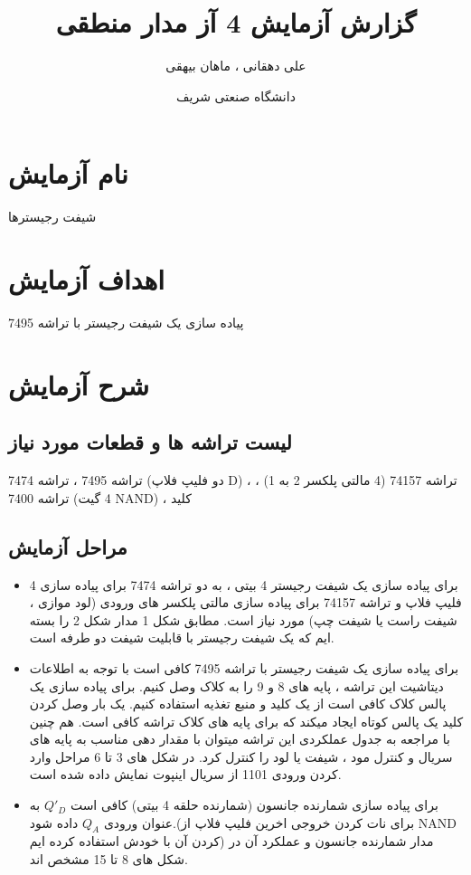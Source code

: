 \documentclass[twoside]{article}
\title{\Huge گزارش آزمایش 4 آز مدار منطقی }
\author{\Large علی دهقانی ، ماهان بیهقی}
\date{دانشگاه صنعتی شریف}
\begin{document}
	\maketitle
	\newpage
	\section*{نام آزمایش}
	شیفت رجیسترها
	
	\section*{اهداف آزمایش}
	پیاده سازی یک شیفت رجیستر با تراشه 7495
	
	\section*{شرح آزمایش}
	
	\subsection*{لیست تراشه ها و قطعات مورد نیاز}
	تراشه 7495 ، تراشه 7474 (دو فلیپ فلاپ D) ، تراشه 74157 (4 مالتی پلکسر 2 به 1) ، تراشه 7400 (4 گیت NAND) ، کلید 
	
	\subsection*{مراحل آزمایش}
	
	\begin{itemize}
	\item
	برای پیاده سازی یک شیفت رجیستر 4 بیتی ، به دو تراشه 7474 برای پیاده سازی 4 فلیپ فلاپ و تراشه 74157 برای پیاده سازی مالتی پلکسر های ورودی (لود موازی ، شیفت راست یا شیفت چپ) مورد نیاز است. مطابق شکل 1 مدار شکل 2 را بسته ایم که یک شیفت رجیستر با قابلیت شیفت دو طرفه است.
	
	\item
	برای پیاده سازی یک شیفت رجیستر با تراشه 7495 کافی است با توجه به اطلاعات دیتاشیت این تراشه ، پایه های 8 و 9 را به کلاک وصل کنیم. برای پیاده سازی یک پالس کلاک کافی است از یک کلید و منبع تغذیه استفاده کنیم. یک بار وصل کردن کلید یک پالس کوتاه ایجاد میکند که برای پایه های کلاک تراشه کافی است. هم چنین با مراجعه به جدول عملکردی این تراشه میتوان با مقدار دهی مناسب به پایه های سریال و کنترل مود ، شیفت یا لود را کنترل کرد. در شکل های 3 تا 6 مراحل وارد کردن ورودی 1101 از سریال اینپوت نمایش داده شده است.
	
	\item
	برای پیاده سازی شمارنده جانسون (شمارنده حلقه 4 بیتی) کافی است 
	$ Q'_{D} $
	به عنوان ورودی 
	$ Q_{A} $
	داده شود.(برای نات کردن خروجی اخرین فلیپ فلاپ از NAND کردن آن با خودش استفاده کرده ایم) مدار شمارنده جانسون و عملکرد آن در شکل های 8 تا 15 مشخص اند.
	
	\end{itemize}
\end{document}
